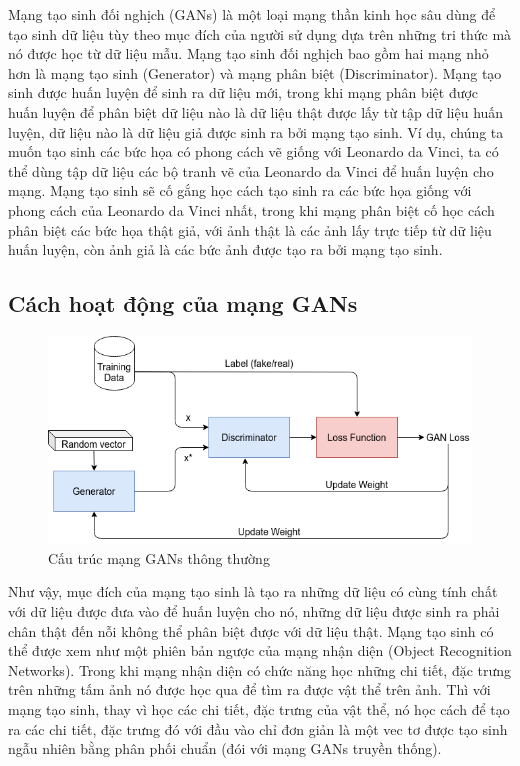 Mạng tạo sinh đối nghịch (GANs) là một loại mạng thần kinh học sâu dùng để tạo sinh dữ liệu tùy theo mục đích của người sử dụng dựa trên những tri thức mà nó được học từ dữ liệu mẫu. Mạng tạo sinh đối nghịch bao gồm hai mạng nhỏ hơn là mạng tạo sinh (Generator) và mạng phân biệt (Discriminator). Mạng tạo sinh được huấn luyện để sinh ra dữ liệu mới, trong khi mạng phân biệt được huấn luyện để phân biệt dữ liệu nào là dữ liệu thật được lấy từ tập dữ liệu huấn luyện, dữ liệu nào là dữ liệu giả được sinh ra bởi mạng tạo sinh. Ví dụ, chúng ta muốn tạo sinh các bức họa có phong cách vẽ giống với Leonardo da Vinci, ta có thể dùng tập dữ liệu các bộ tranh vẽ của Leonardo da Vinci để huấn luyện cho mạng. Mạng tạo sinh sẽ cố gắng học cách tạo sinh ra các bức họa giống với phong cách của Leonardo da Vinci nhất, trong khi mạng phân biệt cố  học cách phân biệt các bức họa thật giả, với ảnh thật là các ảnh lấy trực tiếp từ dữ liệu huấn luyện, còn ảnh giả là các bức ảnh được tạo ra bởi mạng tạo sinh.

\subsection{Cách hoạt động của mạng GANs}
\begin{figure}[H]
    \centering
    \includegraphics[width=15cm]{./content/materials/gans-pure.png}
    \caption{Cấu trúc mạng GANs thông thường}
    \label{fig:pure-gans}
\end{figure}

Như vậy, mục đích của mạng tạo sinh là tạo ra những dữ liệu có cùng tính chất với dữ liệu được đưa vào để huấn luyện cho nó, những dữ liệu được sinh ra phải chân thật đến nỗi không thể phân biệt được với dữ liệu thật. Mạng tạo sinh có thể được xem như một phiên bản ngược của mạng nhận diện (Object Recognition Networks). Trong khi mạng nhận diện có chức năng học những chi tiết, đặc trưng trên những tấm ảnh nó được học qua để tìm ra được vật thể trên ảnh. Thì với mạng tạo sinh, thay vì học các chi tiết, đặc trưng của vật thể, nó học cách để tạo ra các chi tiết, đặc trưng đó với đầu vào chỉ đơn giản là một vec tơ được tạo sinh ngẫu nhiên bằng phân phối chuẩn (đói với mạng GANs truyền thống). 

